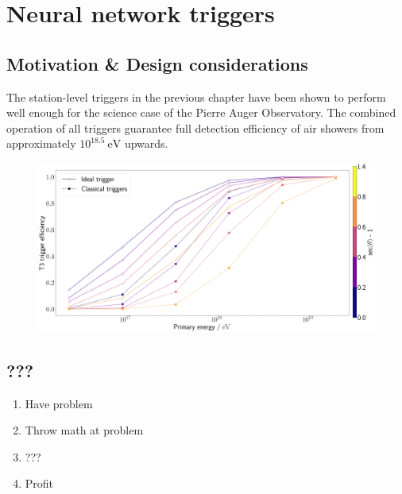 
\chapter{Neural network triggers}
\label{chap:neural-network-triggers}

\section{Motivation \& Design considerations}
\label{sec:motivation}

The station-level triggers in the previous chapter have been shown to perform well enough for the science case of the Pierre Auger Observatory. The combined 
operation of all triggers guarantee full detection efficiency of air showers from approximately $10^{18.5}\SI{}{\electronvolt}$ upwards. 

\begin{figure}
	\centering
	\includegraphics[width=\textwidth]{./plots/ideal_t3_efficiency.png}
	\caption{} 
	\label{fig:t3-efficiency-comparison}
\end{figure}


\section{???}

\begin{enumerate}
    \item Have problem
    \item Throw math at problem
    \item ???
    \item Profit
\end{enumerate}

